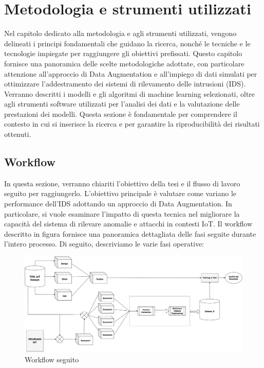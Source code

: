 \chapter{Metodologia e strumenti utilizzati}
Nel capitolo dedicato alla metodologia e agli strumenti utilizzati, vengono delineati i principi fondamentali che guidano la ricerca, nonché le tecniche e le tecnologie impiegate per raggiungere gli obiettivi prefissati. Questo capitolo fornisce una panoramica delle scelte metodologiche adottate, con particolare attenzione all'approccio di Data Augmentation e all'impiego di dati simulati per ottimizzare l'addestramento dei sistemi di rilevamento delle intrusioni (IDS). Verranno descritti i modelli e gli algoritmi di machine learning selezionati, oltre agli strumenti software utilizzati per l'analisi dei dati e la valutazione delle prestazioni dei modelli. Questa sezione è fondamentale per comprendere il contesto in cui si inserisce la ricerca e per garantire la riproducibilità dei risultati ottenuti.

\section{Workflow}

In questa sezione, verranno chiariti l'obiettivo della tesi e il flusso di lavoro seguito per raggiungerlo. L'obiettivo principale è valutare come variano le performance dell'IDS adottando un approccio di Data Augmentation. In particolare, si vuole esaminare l'impatto di questa tecnica nel migliorare la capacità del sistema di rilevare anomalie e attacchi in contesti IoT. Il workflow descritto in figura fornisce una panoramica dettagliata delle fasi seguite durante l'intero processo. Di seguito, descriviamo le varie fasi operative:

\begin{figure}[htbp]
\centering
\includegraphics[scale= 0.27]{UNINA_MSc_Thesis_Project/img/chapterMetodologia/Workflow_Bold_XXL.png}
  \caption{Workflow seguito}
\end{figure}


